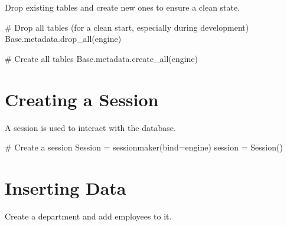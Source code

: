 \documentclass[
  letterpaper,
  DIV=11,
  numbers=noendperiod]{scrreprt}
\newenvironment{Shaded}{\begin{snugshade}}{\end{snugshade}}
\newcommand{\CommentTok}[1]{\textcolor[rgb]{0.37,0.37,0.37}{#1}}
\newcommand{\NormalTok}[1]{\textcolor[rgb]{0.00,0.23,0.31}{#1}}
\newcommand{\OperatorTok}[1]{\textcolor[rgb]{0.37,0.37,0.37}{#1}}
\begin{document}
Drop existing tables and create new ones to ensure a clean state.

\begin{Shaded}
\begin{Highlighting}[]
\CommentTok{\# Drop all tables (for a clean start, especially during development)}
\NormalTok{Base.metadata.drop\_all(engine)}

\CommentTok{\# Create all tables}
\NormalTok{Base.metadata.create\_all(engine)}
\end{Highlighting}
\end{Shaded}

\section{Creating a Session}\label{creating-a-session}

A session is used to interact with the database.

\begin{Shaded}
\begin{Highlighting}[]
\CommentTok{\# Create a session}
\NormalTok{Session }\OperatorTok{=}\NormalTok{ sessionmaker(bind}\OperatorTok{=}\NormalTok{engine)}
\NormalTok{session }\OperatorTok{=}\NormalTok{ Session()}
\end{Highlighting}
\end{Shaded}

\section{Inserting Data}\label{inserting-data-1}

Create a department and add employees to it.
\end{document}
